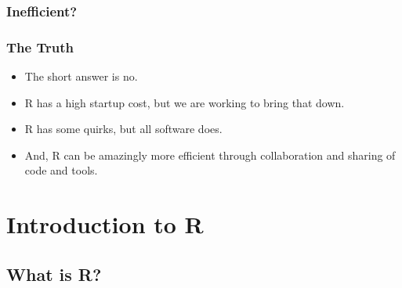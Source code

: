 \documentclass[12pt,handout]{beamer}
\begin{document}
{
\begin{frame}[plain]
\frametitle{Inefficient?}
\end{frame}
}


\begin{frame}
\frametitle{The Truth}
\begin{itemize}
   \item The short answer is no. 
   \pause
   \item R has a high startup cost, but we are working to bring that down. 
   \pause
   \item R has some quirks, but all software does.
   \pause
   \item And, R can be amazingly more efficient through collaboration and sharing of code and tools.
\end{itemize}
\end{frame}


\section{Introduction to R}
\label{sec:intro-r}

\subsection{What is R?}
\label{sec:what-r}
\end{document}
